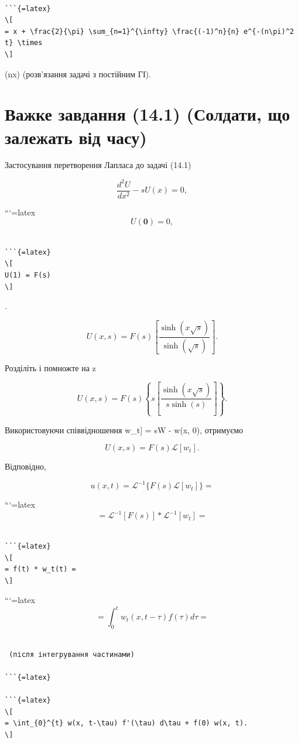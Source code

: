 \documentclass[
  ukrainian,
]{article}
\begin{document}
\begin{verbatim}

```{=latex}
\[
= x + \frac{2}{\pi} \sum_{n=1}^{\infty} \frac{(-1)^n}{n} e^{-(n\pi)^2 t} \times
\]
\end{verbatim}

\times \sin(n\pi x) (розв'язання задачі з постійним ГІ).

\section{Важке завдання (14.1) (Солдати, що залежать від
часу)}\label{ux432ux430ux436ux43aux435-ux437ux430ux432ux434ux430ux43dux43dux44f-14.1-ux441ux43eux43bux434ux430ux442ux438-ux449ux43e-ux437ux430ux43bux435ux436ux430ux442ux44c-ux432ux456ux434-ux447ux430ux441ux443}

Застосування перетворення Лапласа до задачі (14.1)

\[
\frac{d^2U}{dx^2} - sU(x) = 0,
\]

```{=latex}
\[
U\left( \mathbf{0}\right) =0,
\]

\begin{verbatim}

```{=latex}
\[
U(1) = F(s)
\]
\end{verbatim}

.

\[
U(x, s) = F(s) \left[ \frac{\sinh(x \sqrt{s})}{\sinh(\sqrt{s})} \right].
\]

Розділіть і помножте на z

\[
U(x, s) = F(s) \left\{ s \left[ \frac{\sinh(x \sqrt{s})}{s \sinh(s)} \right] \right\}.
\]

Використовуючи співвідношення \mathscr{L}{[}w\_t{]} = sW - w(x, 0),
отримуємо

\[
U(x, s) = F(s) \mathcal{L}[w_t].
\]

Відповідно,

\[
u(x, t) = \mathcal{L}^{-1} \{ F(s) \mathcal{L}[w_t] \} =
\]

```{=latex}
\[
= \mathcal{L}^{-1} [ F(s) ] * \mathcal{L}^{-1}[w_t] =
\]

\begin{verbatim}

```{=latex}
\[
= f(t) * w_t(t) =
\]
\end{verbatim}

```{=latex}
\[
= \int_0^t w_t(x, t-\tau) f(\tau) d\tau =
\]

\begin{verbatim}

 (після інтегрування частинами)

```{=latex}

```{=latex}
\[
= \int_{0}^{t} w(x, t-\tau) f'(\tau) d\tau + f(0) w(x, t).
\]
\end{verbatim}
\end{document}
